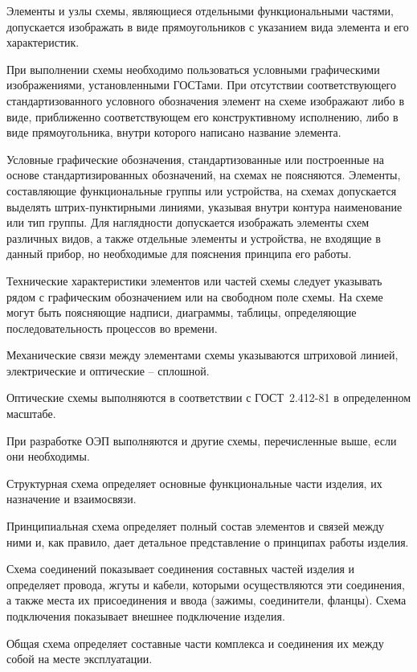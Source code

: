 Элементы и узлы схемы, являющиеся отдельными функциональными частями, допускается изображать в виде прямоугольников с указанием вида элемента и его характеристик.

При выполнении схемы необходимо пользоваться условными графическими изображениями, установленными ГОСТами. При отсутствии соответствующего стандартизованного условного обозначения элемент на схеме изображают либо в виде, приближенно соответствующем его конструктивному исполнению, либо в виде прямоугольника, внутри которого написано название элемента.

Условные графические обозначения, стандартизованные или построенные на основе стандартизированных обозначений, на схемах не поясняются. Элементы, составляющие функциональные группы или устройства, на схемах допускается выделять штрих-пунктирными линиями, указывая внутри контура наименование или тип группы. Для наглядности допускается изображать элементы схем различных видов, а также отдельные элементы и устройства, не входящие в данный прибор, но необходимые для пояснения принципа его работы.

Технические характеристики элементов или частей схемы следует указывать рядом с графическим обозначением или на свободном поле схемы. На схеме могут быть поясняющие надписи, диаграммы, таблицы, определяющие последовательность процессов во времени.

Механические связи между элементами схемы указываются штриховой линией, электрические и оптические -- сплошной. 

Оптические схемы выполняются в соответствии с ГОСТ~2.412-81 в определенном масштабе.

При разработке ОЭП выполняются и другие схемы, перечисленные выше, если они необходимы.

Структурная схема определяет основные функциональные части изделия, их назначение и взаимосвязи. 

Принципиальная схема определяет полный состав элементов и связей между ними и, как правило, дает детальное представление о принципах работы изделия. 

Схема соединений показывает соединения составных частей изделия и определяет провода, жгуты и кабели, которыми осуществляются эти соединения, а также места их присоединения и ввода (зажимы, соединители, фланцы).
Схема подключения показывает внешнее подключение изделия. 

Общая схема определяет составные части комплекса и соединения их между собой на месте эксплуатации. 

